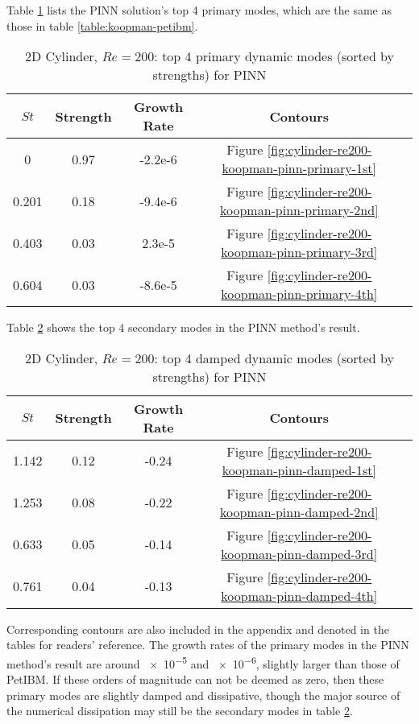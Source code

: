 Table \ref{table:koopman-pinn-primary} lists the PINN solution's top 4 primary modes, which are the same as those in table \ref{table:koopman-petibm}.
\begin{table}
    \begin{threeparttable}[b]
        \begin{tabular}{ccccc}
            \toprule
            $St$ & Strength & Growth Rate & Contours \\
            \midrule
            0     & 0.97 & -2.2e-6  & Figure \ref{fig:cylinder-re200-koopman-pinn-primary-1st}\\
            0.201 & 0.18 & -9.4e-6  & Figure \ref{fig:cylinder-re200-koopman-pinn-primary-2nd}\\
            0.403 & 0.03 &  2.3e-5  & Figure \ref{fig:cylinder-re200-koopman-pinn-primary-3rd}\\
            0.604 & 0.03 & -8.6e-5  & Figure \ref{fig:cylinder-re200-koopman-pinn-primary-4th}\\
            \bottomrule
        \end{tabular}%
        \caption{%
            2D Cylinder, $Re=200$: top 4 primary dynamic modes (sorted by strengths) for PINN%
        }%
        \label{table:koopman-pinn-primary}
    \end{threeparttable}
\end{table}%
Table \ref{table:koopman-pinn-damped} shows the top 4 secondary modes in the PINN method's result.
\begin{table}
    \begin{threeparttable}[b]
        \begin{tabular}{ccccc}
            \toprule
            $St$ & Strength & Growth Rate & Contours \\
            \midrule
            1.142 & 0.12 & -0.24 & Figure \ref{fig:cylinder-re200-koopman-pinn-damped-1st}\\
            1.253 & 0.08 & -0.22 & Figure \ref{fig:cylinder-re200-koopman-pinn-damped-2nd}\\
            0.633 & 0.05 & -0.14 & Figure \ref{fig:cylinder-re200-koopman-pinn-damped-3rd}\\
            0.761 & 0.04 & -0.13 & Figure \ref{fig:cylinder-re200-koopman-pinn-damped-4th}\\
            \bottomrule
        \end{tabular}%
        \caption{%
            2D Cylinder, $Re=200$: top 4 damped dynamic modes (sorted by strengths) for PINN%
        }%
        \label{table:koopman-pinn-damped}
    \end{threeparttable}
\end{table}%
Corresponding contours are also included in the appendix and denoted in the tables for readers' reference.
The growth rates of the primary modes in the PINN method's result are around \num{e-5} and \num{e-6}, slightly larger than those of PetIBM.
If these orders of magnitude can not be deemed as zero, then these primary modes are slightly damped and dissipative, though the major source of the numerical dissipation may still be the secondary modes in table \ref{table:koopman-pinn-damped}.

